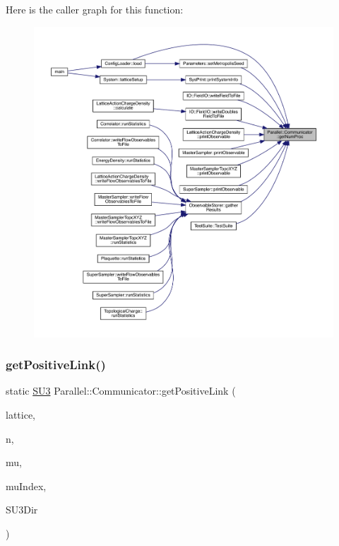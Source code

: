 Here is the caller graph for this function\+:
\nopagebreak
\begin{figure}[H]
\begin{center}
\leavevmode
\includegraphics[width=350pt]{class_parallel_1_1_communicator_a7b1f80fb49a0cc83f2031c3415174150_icgraph}
\end{center}
\end{figure}
\mbox{\label{class_parallel_1_1_communicator_aa716fcde544018dcc5967df9b6708bb5}} 
\subsubsection{\texorpdfstring{getPositiveLink()}{getPositiveLink()}}
{\footnotesize\ttfamily static \mbox{\hyperlink{class_s_u3}{S\+U3}} Parallel\+::\+Communicator\+::get\+Positive\+Link (\begin{DoxyParamCaption}\item[{\mbox{\hyperlink{class_lattice}{Lattice}}$<$ \mbox{\hyperlink{class_s_u3}{S\+U3}} $>$ $\ast$}]{lattice,  }\item[{std\+::vector$<$ int $>$}]{n,  }\item[{int}]{mu,  }\item[{int $\ast$}]{mu\+Index,  }\item[{int}]{S\+U3\+Dir }\end{DoxyParamCaption})\hspace{0.3cm}{\ttfamily [static]}}

